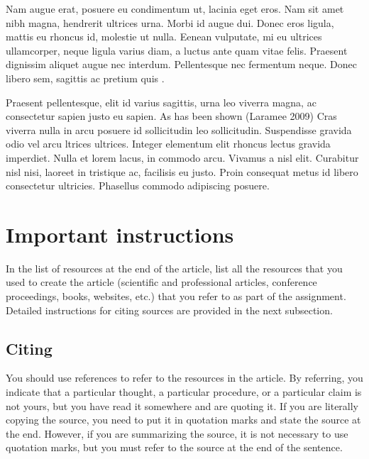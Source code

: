 \documentclass{comjnl}
\begin{document}
Nam augue erat, posuere eu condimentum ut, lacinia eget eros. Nam sit amet nibh magna, hendrerit ultrices urna. Morbi id augue dui. Donec eros ligula, mattis eu rhoncus id, molestie ut nulla. 
Eenean vulputate, mi eu ultrices ullamcorper, neque ligula varius diam, a luctus ante quam vitae felis. Praesent dignissim aliquet augue nec interdum. Pellentesque nec fermentum neque. Donec libero sem, sagittis ac pretium quis \cite{Genon2011}.

\label{Sec:Sklicnapodpoglavje}

Praesent pellentesque, elit id varius sagittis, urna leo viverra magna, ac consectetur sapien justo eu sapien. As has been shown (Laramee 2009) Cras viverra nulla in arcu posuere id sollicitudin leo sollicitudin. Suspendisse gravida odio vel arcu ltrices ultrices. Integer elementum elit rhoncus lectus gravida imperdiet. Nulla et lorem lacus, in commodo arcu. Vivamus a nisl elit. Curabitur nisl nisi, laoreet in tristique ac, facilisis eu justo. Proin consequat metus id libero consectetur ultricies. Phasellus commodo adipiscing posuere.

\section{Important instructions} 

In the list of resources at the end of the article, list all the resources that you used to create the article (scientific and professional articles, conference proceedings, books, websites, etc.) that you refer to as part of the assignment. Detailed instructions for citing sources are provided in the next subsection.


\subsection{Citing}

You should use references to refer to the resources in the article. By referring, you indicate that a particular thought, a particular procedure, or a particular claim is not yours, but you have read it somewhere and are quoting it. If you are literally copying the source, you need to put it in quotation marks and state the source at the end. However, if you are summarizing the source, it is not necessary to use quotation marks, but you must refer to the source at the end of the sentence.
\end{document}
